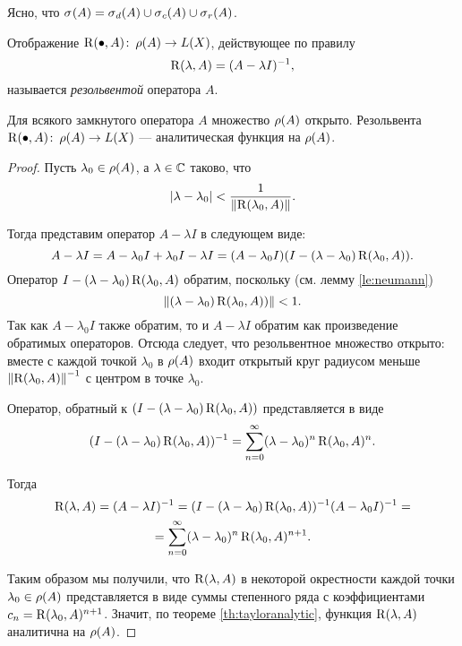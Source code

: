 Ясно, что $\spectrum{A} = \spectrum[d]{A} \cup \spectrum[c]{A} \cup \spectrum[r]{A}$.
\begin{definition}
    Отображение $\operatorname{R}(\bullet, A) \colon \operatorname{\rho}(A) \to L(X)$, действующее по правилу
    \[ \operatorname{R}(\lambda, A) = (A - \lambda I)^{-1}, \]
    называется \emph{резольвентой} оператора $A$.
\end{definition}

\begin{theorem}\label{th:resanalytic}
    Для всякого замкнутого оператора $A$ множество $\operatorname{\rho}(A)$ открыто.
    Резольвента $\operatorname{R}(\bullet, A) \colon \operatorname{\rho}(A) \to L(X)$ --- аналитическая функция
    на $\operatorname{\rho}(A)$.
\end{theorem}

\begin{proof}
    Пусть $\lambda_0 \in \operatorname{\rho}(A)$, а $\lambda \in \mathbb{C}$ таково, что
    \[ \left|\lambda - \lambda_0\right| < \frac{1}{\left\|\operatorname{R}(\lambda_0, A)\right\|}. \]

    Тогда представим оператор $A - \lambda I$ в следующем виде:
    \[ A - \lambda I = A - \lambda_0 I + \lambda_0 I - \lambda I = 
       (A - \lambda_0 I)(I - (\lambda - \lambda_0) \operatorname{R}(\lambda_0, A)). \]
    Оператор $I - (\lambda - \lambda_0) \operatorname{R}(\lambda_0, A)$ обратим, поскольку 
    (см. лемму \ref{le:neumann})
    \[ \left\|(\lambda - \lambda_0) \operatorname{R}(\lambda_0, A))\right\| < 1. \]
    Так как $A - \lambda_0 I$ также обратим, то и $A - \lambda I$ обратим как произведение
    обратимых операторов. Отсюда следует, что резольвентное множество открыто: вместе с каждой
    точкой $\lambda_0$
    в $\operatorname{\rho}(A)$ входит открытый круг радиусом меньше $\left\|\operatorname{R}(\lambda_0, A)\right\|^{-1}$ с 
    центром в точке $\lambda_0$.

    Оператор, обратный к $(I - (\lambda - \lambda_0) \operatorname{R}(\lambda_0, A))$ представляется
    в виде
    \[ (I - (\lambda - \lambda_0) \operatorname{R}(\lambda_0, A))^{-1} = 
        \sum_{n=0}^\infty (\lambda - \lambda_0)^n \operatorname{R}(\lambda_0, A)^n. \]

    Тогда 
    \begin{multline*}
        \operatorname{R}(\lambda, A) = 
            (A - \lambda I)^{-1} = (I - (\lambda - \lambda_0) \operatorname{R}(\lambda_0, A))^{-1}
             (A - \lambda_0 I)^{-1} =\\= \sum_{n=0}^\infty (\lambda - \lambda_0)^n 
             \operatorname{R}(\lambda_0, A)^{n+1}.
    \end{multline*}

    Таким образом мы получили, что $\operatorname{R}(\lambda, A)$ в некоторой окрестности каждой точки
    $\lambda_0 \in \operatorname{\rho}(A)$
    представляется в виде суммы степенного ряда с коэффициентами 
    $c_n = \operatorname{R}(\lambda_0, A)^{n+1}$. Значит, по теореме \ref{th:tayloranalytic},
    функция $\operatorname{R}(\lambda, A)$ аналитична на $\operatorname{\rho}(A)$.
\end{proof}

